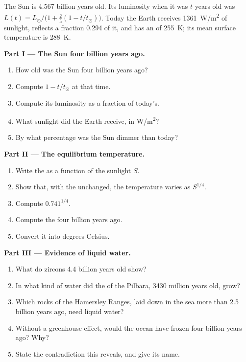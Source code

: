 \begin{problem}
\label{pb:g12:early-earth:1}
The Sun is \num{4.567} billion years old. Its luminosity when it was $t$
years old was $L(t) = L_\odot/\bigl(1 + \tfrac25 (1 - t/t_\odot)\bigr)$. Today
the Earth receives \qty{1361}{W/m^2} of sunlight, reflects a fraction 0.294
of it, and has an  of \qty{255}{K}; its mean surface
temperature is \qty{288}{K}.

\medskip
\noindent\textbf{Part I --- The Sun four billion years ago.}
\begin{enumerate}
  \item How old was the Sun four billion years ago?
  \item Compute $1 - t/t_\odot$ at that time.
  \item Compute its luminosity as a fraction of today's.
  \item What sunlight did the Earth receive, in \unit{W/m^2}?
  \item By what percentage was the Sun dimmer than today?
\end{enumerate}

\medskip
\noindent\textbf{Part II --- The equilibrium temperature.}
\begin{enumerate}[resume]
  \item Write the  as a function of the sunlight $S$.
  \item Show that, with the  unchanged, the temperature varies as
        $S^{1/4}$.
  \item Compute $0.741^{1/4}$.
  \item Compute the  four billion years ago.
  \item Convert it into degrees Celsius.
\end{enumerate}

\medskip
\noindent\textbf{Part III --- Evidence of liquid water.}
\begin{enumerate}[resume]
  \item What do zircons 4.4 billion years old show?
  \item In what kind of water did the  of the Pilbara,
        \num{3430} million years old, grow?
  \item Which rocks of the Hamersley Ranges, laid down in the sea more than
        2.5 billion years ago, need liquid water?
  \item Without a greenhouse effect, would the ocean have frozen four
        billion years ago? Why?
  \item State the contradiction this reveals, and give its name.
\end{enumerate}


\end{problem}
